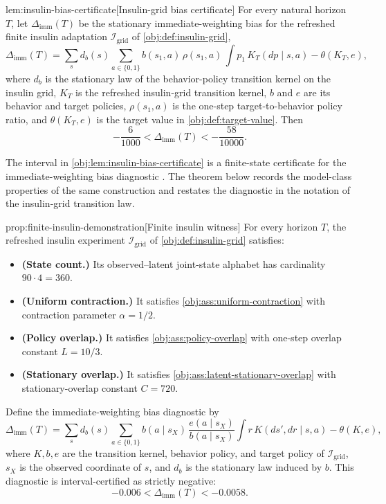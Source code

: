 \begin{lemmav}{lem:insulin-bias-certificate}[Insulin-grid bias certificate]
For every natural horizon \(T\), let \(\Delta_{\mathrm{imm}}(T)\) be the stationary immediate-weighting bias for the refreshed finite insulin adaptation \(\mathcal I_{\mathrm{grid}}\) of \cref{obj:def:insulin-grid},
\[
\Delta_{\mathrm{imm}}(T)
=
\sum_s d_b(s)
\sum_{a\in\{0,1\}}
b(s_1,a)\,
\rho(s_1,a)\,
\int p_1\,K_T(dp\mid s,a)
-
\theta(K_T,e),
\]
where \(d_b\) is the stationary law of the behavior-policy transition kernel on the insulin grid, \(K_T\) is the refreshed insulin-grid transition kernel, \(b\) and \(e\) are its behavior and target policies, \(\rho(s_1,a)\) is the one-step target-to-behavior policy ratio, and \(\theta(K_T,e)\) is the target value in \cref{obj:def:target-value}. Then
\[
-\frac{6}{1000}
<
\Delta_{\mathrm{imm}}(T)
<
-\frac{58}{10000}.
\]
\end{lemmav}

The interval in \cref{obj:lem:insulin-bias-certificate} is a finite-state certificate for the immediate-weighting bias diagnostic . The theorem below records the model-class properties of the same construction and restates the diagnostic in the notation of the insulin-grid transition law.

\begin{theoremv}{prop:finite-insulin-demonstration}[Finite insulin witness]
For every horizon \(T\), the refreshed insulin experiment \(\mathcal I_{\mathrm{grid}}\) of \cref{obj:def:insulin-grid} satisfies:
\begin{itemize}
\item \textbf{(State count.)} Its observed--latent joint-state alphabet has cardinality \(90\cdot 4=360\).
\item \textbf{(Uniform contraction.)} It satisfies \cref{obj:ass:uniform-contraction} with contraction parameter \(\alpha=1/2\).
\item \textbf{(Policy overlap.)} It satisfies \cref{obj:ass:policy-overlap} with one-step overlap constant \(L=10/3\).
\item \textbf{(Stationary overlap.)} It satisfies \cref{obj:ass:latent-stationary-overlap} with stationary-overlap constant \(C=720\).
\end{itemize}
Define the immediate-weighting bias diagnostic by
\[
\Delta_{\mathrm{imm}}(T)
=
\sum_s d_b(s)\sum_{a\in\{0,1\}} b(a\mid s_X)\,
\frac{e(a\mid s_X)}{b(a\mid s_X)}
\int r\,K(ds',dr\mid s,a)
-
\theta(K,e),
\]
where \(K,b,e\) are the transition kernel, behavior policy, and target policy of \(\mathcal I_{\mathrm{grid}}\), \(s_X\) is the observed coordinate of \(s\), and \(d_b\) is the stationary law induced by \(b\). This diagnostic is interval-certified as strictly negative:
\[
-0.006 < \Delta_{\mathrm{imm}}(T) < -0.0058 .
\]
\end{theoremv}

